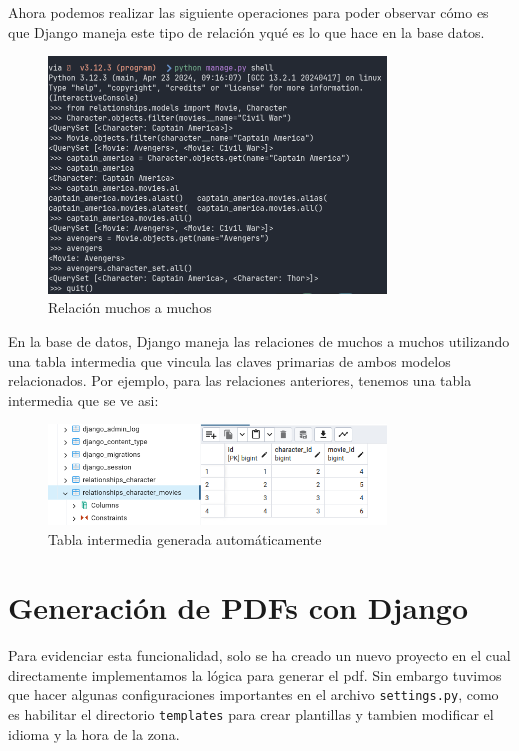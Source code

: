 \documentclass[10pt, a4paper]{article}
\newcommand{\mpy}[1]{\texttt{#1}}
\begin{document}
Ahora podemos realizar las siguiente operaciones para poder observar cómo es que Django maneja este tipo de relación yqué es lo que hace en la base datos.

\begin{figure}[H]
  \centering
  \includegraphics[width=0.8\textwidth]{img/3_many_to_many.png}
  \caption{Relación muchos a muchos}
\end{figure}

En la base de datos, Django maneja las relaciones de muchos a muchos utilizando una tabla intermedia que vincula las claves primarias de ambos modelos relacionados. Por ejemplo, para las relaciones anteriores, tenemos una tabla intermedia que se ve asi:

\begin{figure}[H]
  \centering
  \includegraphics[width=0.8\textwidth]{img/4_intermediate_table.png}
  \caption{Tabla intermedia generada automáticamente}
\end{figure}

\section{Generación de PDFs con Django}
Para evidenciar esta funcionalidad, solo se ha creado un nuevo proyecto en el cual directamente implementamos la lógica para generar el pdf. Sin embargo tuvimos que hacer algunas configuraciones importantes en el archivo \mpy{settings.py}, como es habilitar el directorio \mpy{templates} para crear plantillas y tambien modificar el idioma y la hora de la zona.
\end{document}
